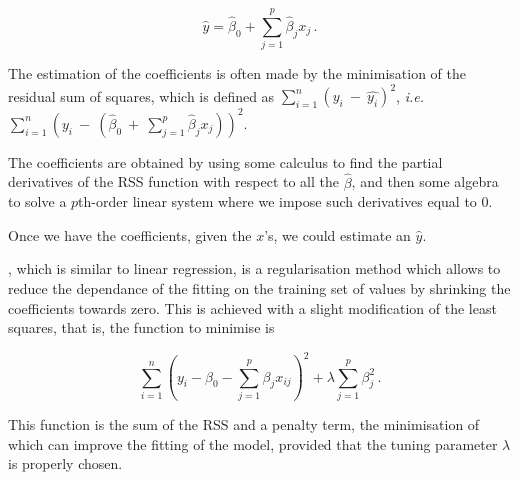 \documentclass[../main.tex]{subfiles}
\begin{document}
\begin{equation}
	\hat{y} = \hat{\beta}_0 + \sum_{j=1}^{p}\hat{\beta}_j x_j\,.
\end{equation}

The estimation of the coefficients is often made by the minimisation of 
the residual sum of squares, which is defined as 
$\sum_{i=1}^{n}(y_i~-~\hat{y_i})^2$, \textit{i.e.}\ 
$\sum_{i=1}^{n}(y_i~-~(\hat{\beta}_0~+~\sum_{j=1}^{p}\hat{\beta}_jx_j))^2$.

The coefficients are obtained by using some calculus to find the partial 
derivatives of the RSS function with respect to all the $\hat{\beta}$, 
and then some algebra to solve a $p$th-order linear system where we 
impose such derivatives equal to 0.


Once we have the coefficients, given the $x$'s, we could estimate an 
$\hat{y}$.

, which is similar to 
linear regression, is a regularisation method which allows to reduce the 
dependance of the fitting on the training set of values by shrinking the 
coefficients towards zero. This is achieved with a slight modification 
of the least squares, that is, the function to minimise is

\begin{equation}
	\sum_{i=1}^{n}\left(y_i-\beta_0-\sum_{j=1}^{p}\beta_jx_{ij}\right)^2+
		\lambda\sum_{j=1}^{p}\beta_j^2\,.
\end{equation}

This function is the sum of the RSS and a penalty term, the minimisation 
of which can improve the fitting of the model, provided that the tuning 
parameter $\lambda$ is properly chosen.
\end{document}
